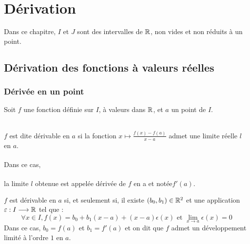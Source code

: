 \chapter{Dérivation}

\minitoc

Dans ce chapitre, \(I\) et \(J\) sont des intervalles de \(\mathbb{R}\), non vides et non réduits à un point.

\section{Dérivation des fonctions à valeurs réelles}
\subsection{Dérivée en un point}
Soit \(f\) une fonction définie sur \(I\), à valeurs dans \(\mathbb{R}\), et \(a\) un point de \(I\).

\begin{defi}
    ~\\
	\(f\) est dite dérivable en \(a\) si la fonction \(x \mapsto \frac{f (x) - f (a)}{x - a}\) admet une limite réelle \(l\) en \(a\).\\~\\
	Dans ce cas,\\~\\
	la limite \(l\) obtenue est appelée dérivée de \(f\) en a et notée\( f'(a)\).
\end{defi}

\begin{defprop}
	\(f\) est dérivable en \(a\) si, et seulement si, il existe \((b_0, b_1) \in \mathbb{R}^2\) et une application \(\varepsilon : I \longrightarrow \mathbb{R}\) tel que :
	\[\forall x \in I, f (x) = b_0 + b_1(x - a) + (x - a) \epsilon(x)\text{ et }\lim_{x\to a} \epsilon(x) = 0\]
	Dans ce cas, \(b_0 = f (a)\) et \(b_1 = f '(a) \) et on dit que \(f\) admet un développement limité à l’ordre \(1\) en \(a\).
\end{defprop}

